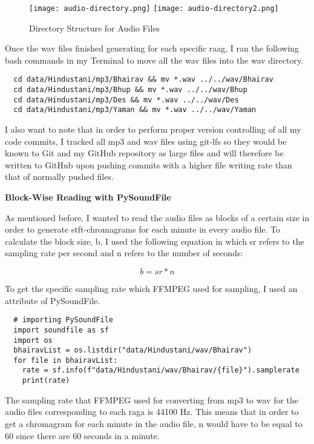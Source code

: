 \begin{figure}
  \caption{Directory Structure for Audio Files}
  \texttt{[image: audio-directory.png]}
  \texttt{[image: audio-directory2.png]}
\end{figure}

Once the wav files finished generating for each specific raag, I ran the following bash commands in my Terminal to move all the wav files into the wav directory.

\begin{lstlisting}
  cd data/Hindustani/mp3/Bhairav && mv *.wav ../../wav/Bhairav
  cd data/Hindustani/mp3/Bhup && mv *.wav ../../wav/Bhup
  cd data/Hindustani/mp3/Des && mv *.wav ../../wav/Des
  cd data/Hindustani/mp3/Yaman && mv *.wav ../../wav/Yaman
\end{lstlisting}

I also want to note that in order to perform proper version controlling of all my code commits, I tracked all mp3 and wav files using git-lfs so they would be known to Git and my GitHub repository as large files and will therefore be written to GitHub upon pushing commits with a higher file writing rate than that of normally pushed files.

\begin{flushleft}
  \textbf{Block-Wise Reading with PySoundFile}
\end{flushleft}

As mentioned before, I wanted to read the audio files as blocks of a certain size in order to generate stft-chromagrams for each minute in every audio file. To calculate the block size, b, I used the following equation in which sr refers to the sampling rate per second and n refers to the number of seconds:

$$ b = sr * n $$

To get the specific sampling rate which FFMPEG used for sampling, I used an attribute of PySoundFile.

\begin{lstlisting}
  # importing PySoundFile
  import soundfile as sf
  import os
  bhairavList = os.listdir("data/Hindustani/wav/Bhairav")
  for file in bhairavList:
    rate = sf.info(f"data/Hindustani/wav/Bhairav/{file}").samplerate
    print(rate)
\end{lstlisting}

The sampling rate that FFMPEG used for converting from mp3 to wav for the audio files corresponding to each raga is 44100 Hz. This means that in order to get a chromagram for each minute in the audio file, n would have to be equal to 60 since there are 60 seconds in a minute.

